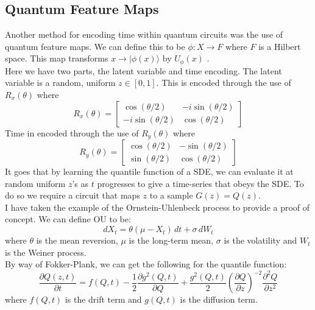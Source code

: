 \documentclass[12pt]{article}
\numberwithin{equation}{section}
\begin{document}
\subsection{Quantum Feature Maps}
Another method for encoding time within quantum circuits was the use of
quantum feature maps. We can define this to be $\phi : X \rightarrow F$ where $F$
is a Hilbert space. This map transforms $x \rightarrow |\phi(x)\rangle$ by  $U_\phi(x)$\autocite{paine_quantum_2023,steinbrecher_quantile_2008,vlasic_quantum_2024} .
\\ 
Here we have two parts, the latent variable and time encoding. The latent variable 
is a random, uniform $z \in [0,1] $. This is encoded through the use of $R_x(\theta)$ where 
\begin{equation}
R_x(\theta) = 
\begin{bmatrix}
\cos(\theta/2) & -i\sin(\theta/2) \\
-i\sin(\theta/2) & \cos(\theta/2)
\end{bmatrix}
\end{equation}
Time in encoded through the use of $R_y(\theta)$ where 
\begin{equation}
R_y(\theta) = 
\begin{bmatrix}
\cos(\theta/2) & -\sin(\theta/2) \\
\sin(\theta/2) & \cos(\theta/2)
\end{bmatrix}
\end{equation}
It goes that by learning the quantile function of a SDE, we can evaluate it at 
random uniform $z$'s as $t$ progresses to give a time-series that obeys the 
SDE. To do so we require a circuit that maps $z$ to a sample $G(z) = Q(z)$. \\ 
I have taken the example of the Ornstein-Uhlenbeck process to provide a proof of 
concept. We can define OU to be: 
\begin{equation}
  dX_t = \theta (\mu - X_t) \, dt + \sigma \, dW_t 
\end{equation}
where $\theta$ is the mean reversion, $\mu$ is the long-term mean, $\sigma$ is the 
volatility and $W_t$ is the Weiner process. 
\\
By way of Fokker-Plank, we can get the following for the quantile function:
\begin{equation}
  \frac{\partial Q(z,t)}{\partial t} = f(Q,t) - \frac{1}{2}\frac{\partial g^2(Q,t)}
{\partial Q} + \frac{g^2(Q,t)}{2}(\frac{\partial Q}{\partial z})^{-2}
  \frac{\partial ^2Q}{\partial z^2}
\end{equation}
where $f(Q,t)$ is the drift term and $g(Q,t)$ is the diffusion term. 
\end{document}
